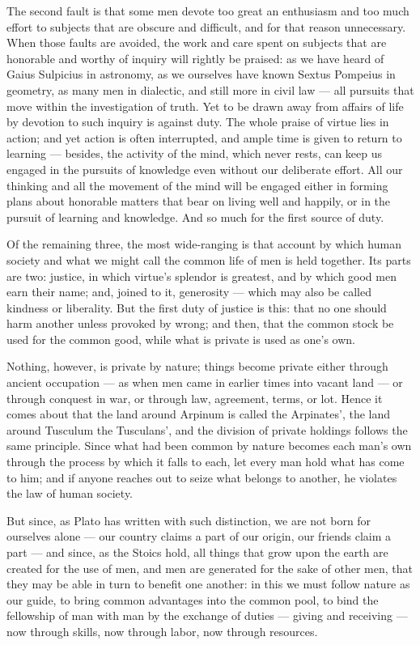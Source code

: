  The second fault is that some men devote too great an enthusiasm and too much effort to subjects that are obscure and difficult, and for that reason unnecessary. When those faults are avoided, the work and care spent on subjects that are honorable and worthy of inquiry will rightly be praised: as we have heard of Gaius Sulpicius in astronomy, as we ourselves have known Sextus Pompeius in geometry, as many men in dialectic, and still more in civil law — all pursuits that move within the investigation of truth. Yet to be drawn away from affairs of life by devotion to such inquiry is against duty. The whole praise of virtue lies in action; and yet action is often interrupted, and ample time is given to return to learning — besides, the activity of the mind, which never rests, can keep us engaged in the pursuits of knowledge even without our deliberate effort. All our thinking and all the movement of the mind will be engaged either in forming plans about honorable matters that bear on living well and happily, or in the pursuit of learning and knowledge. And so much for the first source of duty.

 Of the remaining three, the most wide-ranging is that account by which human society and what we might call the common life of men is held together. Its parts are two: justice, in which virtue's splendor is greatest, and by which good men earn their name; and, joined to it, generosity — which may also be called kindness or liberality. But the first duty of justice is this: that no one should harm another unless provoked by wrong; and then, that the common stock be used for the common good, while what is private is used as one's own.

 Nothing, however, is private by nature; things become private either through ancient occupation — as when men came in earlier times into vacant land — or through conquest in war, or through law, agreement, terms, or lot. Hence it comes about that the land around Arpinum is called the Arpinates', the land around Tusculum the Tusculans', and the division of private holdings follows the same principle. Since what had been common by nature becomes each man's own through the process by which it falls to each, let every man hold what has come to him; and if anyone reaches out to seize what belongs to another, he violates the law of human society.

 But since, as Plato has written with such distinction, we are not born for ourselves alone — our country claims a part of our origin, our friends claim a part — and since, as the Stoics hold, all things that grow upon the earth are created for the use of men, and men are generated for the sake of other men, that they may be able in turn to benefit one another: in this we must follow nature as our guide, to bring common advantages into the common pool, to bind the fellowship of man with man by the exchange of duties — giving and receiving — now through skills, now through labor, now through resources.

